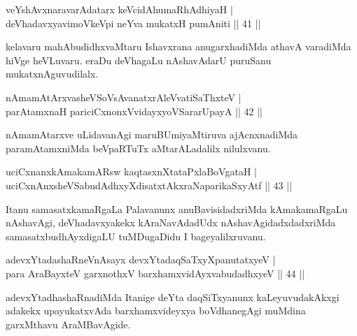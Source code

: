 

\begin{shl}
veYshAvxnaravarAdatarx keVcidAhumaRhAdhiyaH |\\
deVhadavxyavimoVkeV\s pi neYva mukatxH pumAniti \hfill || 41 ||
\end{shl}


\begin{artha}
kelavaru mahAbudidhxvaMtaru Ishavxrana anugarxhadiMda athavA varadiMda hiVge heVLuvaru. eraDu deVhagaLu nAshavAdarU puruSanu mukatxnAguvudilalx.
\end{artha}


\begin{shl}
nAmamAtArxvasheVSoV\s sAvanatxrAleV\s vatiSaThxteV |\\
parAtamxnaH pariciCxnonxV\s vidayxyoVSararUpayA \hfill || 42 ||
\end{shl}

\begin{artha}
nAmamAtarxve uLidavanAgi maruBUmiyaMtiruva ajAcnxnadiMda paramAtamxniMda beVpaRTuTx 
aMtarALadalilx nilulxvanu.
\end{artha}

\begin{shl}
uciCxnanxkAmakamAR\s sw kaqtasxnXtataPxlaBoVgataH |\\
uciCxnAnxsheVSabudAdhxyXdisatxtAkxraNaparikaSxyAtf \hfill || 43 ||
\end{shl}

\begin{artha}
Itanu samasatxkamaRgaLa Palavanunx anuBavisidadxriMda kAmakamaRgaLu nAshavAgi, deVhadavxyakekx kAraNavAdadUdx nAshavAgidadxdadx\-riMda samasatxbudhAyxdigaLU tuMDugaDidu  I bageyalilxruvanu.
\end{artha}

\begin{shl}
adevxYtadashaRneVnAsayx devxYtadaqSaTxyXpanutatxyeV |\\
para AraBayxteV garxnothxV barxhamxvidAyxvabudadhxyeV \hfill || 44 ||
\end{shl}

\begin{artha}
adevxYtadhashaRnadiMda Itanige deYta daqSiTxyanunx kaLeyuvudakAkxgi adakekx upayukatxvAda barxhamxvideyxya boVdhanegAgi muMdina garxMthavu AraMBavAgide.
\end{artha}

